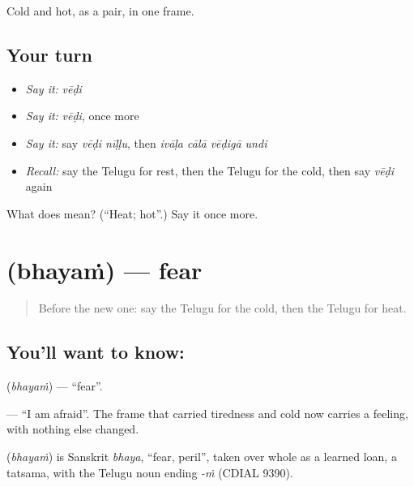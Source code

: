\begin{grammarlens}[title={What you've built}]
Cold and hot, as a pair, in one frame.
\end{grammarlens}

\subsection*{Your turn}
\begin{itemize}
\raggedright
  \item \emph{Say it:} \emph{vēḍi}
  \item \emph{Say it:} \emph{vēḍi}, once more
  \item \emph{Say it:} say \emph{vēḍi nīḷḷu}, then \emph{ivāḷa cālā vēḍigā undi}
  \item \emph{Recall:} say the Telugu for rest, then the Telugu for the cold, then say \emph{vēḍi} again
\end{itemize}

\begin{tcolorbox}[breakable,colback=teal!4,colframe=teal!35!black,title={Before you move on}]
What does  mean? (\textquotedblleft{}Heat; hot\textquotedblright{}.) Say it once more.
\end{tcolorbox}
\section[\texorpdfstring{\te{భయం} (bhayaṁ)}{భయం (bhayaṁ)}]{ (bhayaṁ) — fear}

\label{lesson:TE-C85-fear}



\begin{quote}
Before the new one: say the Telugu for the cold, then the Telugu for heat.
\end{quote}

\subsection*{You'll want to know: }
\textbf{} (\emph{bhayaṁ}) — \textquotedblleft{}fear\textquotedblright{}.

\textbf{  } — \textquotedblleft{}I am afraid\textquotedblright{}. The frame that carried tiredness and cold now carries a feeling, with nothing else changed.

\begin{cousinweb}
\textbf{} (\emph{bhayaṁ}) is Sanskrit \emph{bhaya}, \textquotedblleft{}fear, peril\textquotedblright{}, taken over whole as a learned loan, a tatsama, with the Telugu noun ending \emph{-ṁ} (CDIAL 9390).
\end{cousinweb}

